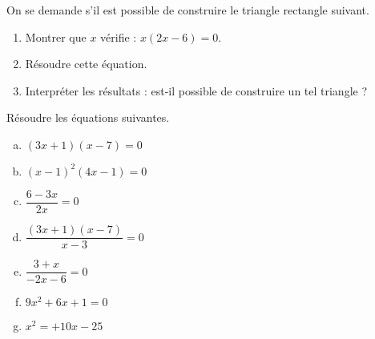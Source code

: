 \documentclass[11pt]{article}
\begin{document}
  \begin{exercice} On se demande s'il est possible de construire le triangle rectangle suivant.

    \begin{center}
    \end{center}
    \begin{enumerate}
      \item Montrer que $x$ vérifie : $x(2x-6)=0$.
      \item Résoudre cette équation.
      \item Interpréter les résultats : est-il possible de construire un tel triangle ?
    \end{enumerate}
  \end{exercice}
  \begin{exercice}
    Résoudre les équations suivantes.

    \begin{multicols}{2}
    \begin{enumerate}[(a)]
      \item $(3x+1)(x-7)=0$
      \item $(x-1)^2(4x-1)=0$
      \item $\dfrac{6-3x}{2x}=0$
      \item $\dfrac{(3x+1)(x-7)}{x-3}=0$
      \item $\dfrac{3+x}{-2x-6}=0$
      \item $9x^2+6x+1=0$
      \item $x^2=+10x-25$
    \end{enumerate}
  \end{multicols}
  \end{exercice}
\end{document}
